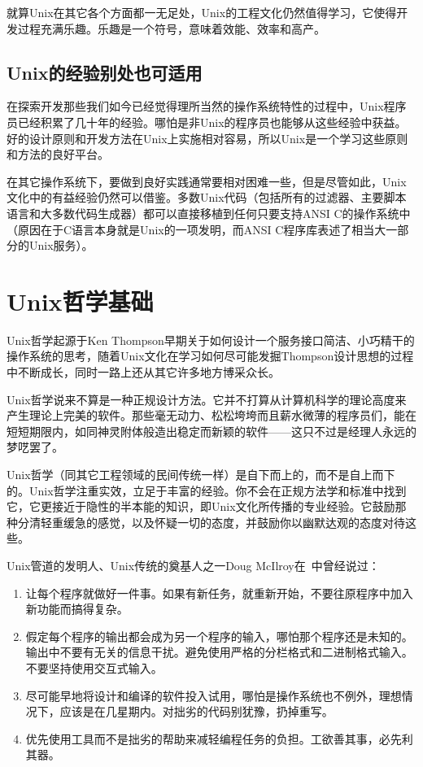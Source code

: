 \documentclass[12pt,oneside]{ctexbook}
\begin{document}
\begin{common-format}
就算Unix在其它各个方面都一无足处，Unix的工程文化仍然值得学习，它使得开发过程充满乐趣。乐趣是一个符号，意味着效能、效率和高产。

\subsection{Unix的经验别处也可适用}
在探索开发那些我们如今已经觉得理所当然的操作系统特性的过程中，Unix程序员已经积累了几十年的经验。哪怕是非Unix的程序员也能够从这些经验中获益。好的设计原则和开发方法在Unix上实施相对容易，所以Unix是一个学习这些原则和方法的良好平台。

在其它操作系统下，要做到良好实践通常要相对困难一些，但是尽管如此，Unix文化中的有益经验仍然可以借鉴。多数Unix代码（包括所有的过滤器、主要脚本语言和大多数代码生成器）都可以直接移植到任何只要支持ANSI C的操作系统中（原因在于C语言本身就是Unix的一项发明，而ANSI C程序库表述了相当大一部分的Unix服务）。


\section{Unix哲学基础}
Unix哲学起源于Ken Thompson早期关于如何设计一个服务接口简洁、小巧精干的操作系统的思考，随着Unix文化在学习如何尽可能发掘Thompson设计思想的过程中不断成长，同时一路上还从其它许多地方博采众长。

Unix哲学说来不算是一种正规设计方法。它并不打算从计算机科学的理论高度来产生理论上完美的软件。那些毫无动力、松松垮垮而且薪水微薄的程序员们，能在短短期限内，如同神灵附体般造出稳定而新颖的软件——这只不过是经理人永远的梦呓罢了。

Unix哲学（同其它工程领域的民间传统一样）是自下而上的，而不是自上而下的。Unix哲学注重实效，立足于丰富的经验。你不会在正规方法学和标准中找到它，它更接近于隐性的半本能的知识，即Unix文化所传播的专业经验。它鼓励那种分清轻重缓急的感觉，以及怀疑一切的态度，并鼓励你以幽默达观的态度对待这些。

Unix管道的发明人、Unix传统的奠基人之一Doug McIlroy在~\cite{McIlroy78}中曾经说过：
\begin{enumerate}
\renewcommand{\labelenumi}{（\roman{enumi}）}
\item 让每个程序就做好一件事。如果有新任务，就重新开始，不要往原程序中加入新功能而搞得复杂。
\item 假定每个程序的输出都会成为另一个程序的输入，哪怕那个程序还是未知的。输出中不要有无关的信息干扰。避免使用严格的分栏格式和二进制格式输入。不要坚持使用交互式输入。
\item 尽可能早地将设计和编译的软件投入试用，哪怕是操作系统也不例外，理想情况下，应该是在几星期内。对拙劣的代码别犹豫，扔掉重写。
\item 优先使用工具而不是拙劣的帮助来减轻编程任务的负担。工欲善其事，必先利其器。
\end{enumerate}


\end{common-format}
\end{document}
